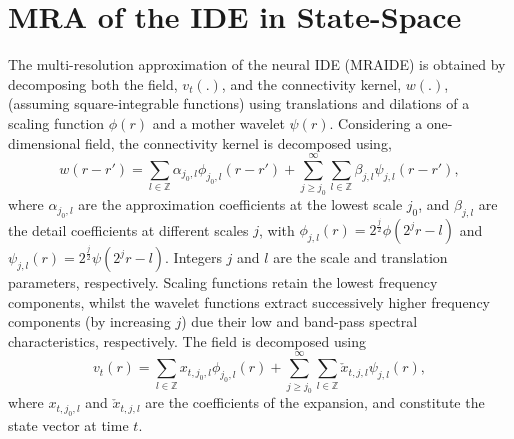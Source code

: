 \documentclass[journal]{IEEEtran}
\newcommand{\dean}[1]{\textcolor{green}{#1}}
\begin{document}
\section{MRA of the IDE in State-Space}
The multi-resolution approximation of the neural IDE (MRAIDE) is obtained by decomposing both the field, $v_t(.)$, and the connectivity kernel, $w(.)$, (assuming square-integrable functions) using translations and dilations of a scaling function $\phi(r)$ and a mother wavelet $\psi(r)$. Considering a one-dimensional field, the connectivity kernel is decomposed using,
\begin{equation}
 w\left(r-r'\right)=\sum_{l \in \mathbb{Z}}\alpha_{j_0,l}\phi_{j_0,l}\left(r-r'\right)+\sum_{j\geq j_0}^{\infty} \sum_{l \in \mathbb{Z}}\beta_{j,l}\psi_{j,l}\left(r-r'\right), 
\label{eq:KernelExpansion}
\end{equation}
where $\alpha_{j_0,l}$ are the approximation coefficients at the lowest scale $j_0$, and $\beta_{j,l}$ are the detail coefficients at different scales $j$, with $\phi_{j,l}\left(r\right)=2^{\frac{j}{2}}\phi\left(2^jr-l\right) $ and $\psi_{j,l}\left(r\right)=2^{\frac{j}{2}}\psi\left(2^jr-l\right)$. Integers $j$ and $l$ are the scale and translation parameters, respectively. Scaling functions retain the lowest frequency components, whilst the wavelet functions extract successively higher frequency components (by increasing $j$) due their low and band-pass spectral characteristics, respectively. The field is decomposed using
\begin{equation}
 v_t\left(r\right)=\sum_{l \in \mathbb{Z}}x_{t,j_{0},l}\phi_{j_{0},l}\left(r\right)+\sum_{j\geq j_0}^{\infty} \sum_{l \in \mathbb{Z}} \check{x}_{t,j,l}\psi_{j,l}\left(r\right),
\label{eq:FieldExpansion}
\end{equation}
where $x_{t,j_{0},l}$ and $\check{x}_{t,j,l} $ are the coefficients of the expansion, and constitute the state vector at time $t$. %
\end{document}
